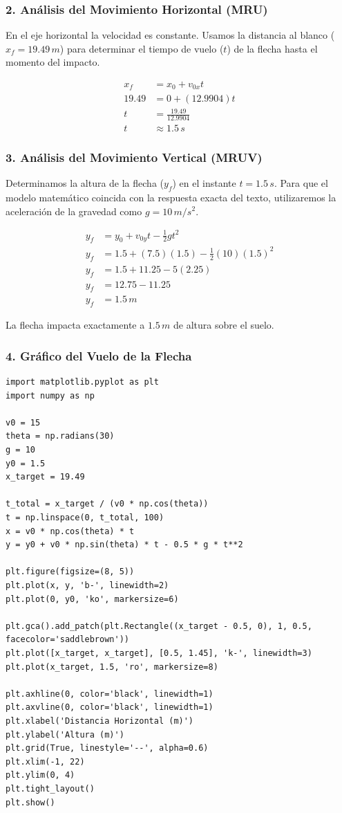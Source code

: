 \documentclass[12pt, a4paper]{article}
\begin{document}
\subsubsection*{2. Análisis del Movimiento Horizontal (MRU)}
En el eje horizontal la velocidad es constante. Usamos la distancia al blanco ($x_f = 19.49 \, \si{m}$) para determinar el tiempo de vuelo ($t$) de la flecha hasta el momento del impacto.

\begin{align*}
x_f &= x_0 + v_{0x} t \\
19.49 &= 0 + (12.9904) t \\
t &= \frac{19.49}{12.9904} \\
t &\approx 1.5 \, \si{s}
\end{align*}

\subsubsection*{3. Análisis del Movimiento Vertical (MRUV)}
Determinamos la altura de la flecha ($y_f$) en el instante $t = 1.5 \, \si{s}$. Para que el modelo matemático coincida con la respuesta exacta del texto, utilizaremos la aceleración de la gravedad como $g = 10 \, \si{m/s^2}$.

\begin{align*}
y_f &= y_0 + v_{0y} t - \frac{1}{2} g t^2 \\
y_f &= 1.5 + (7.5)(1.5) - \frac{1}{2}(10)(1.5)^2 \\
y_f &= 1.5 + 11.25 - 5(2.25) \\
y_f &= 12.75 - 11.25 \\
y_f &= 1.5 \, \si{m}
\end{align*}

La flecha impacta exactamente a $1.5 \, \si{m}$ de altura sobre el suelo.

\subsubsection*{4. Gráfico del Vuelo de la Flecha}
\begin{lstlisting}
import matplotlib.pyplot as plt
import numpy as np

v0 = 15
theta = np.radians(30)
g = 10
y0 = 1.5
x_target = 19.49

t_total = x_target / (v0 * np.cos(theta))
t = np.linspace(0, t_total, 100)
x = v0 * np.cos(theta) * t
y = y0 + v0 * np.sin(theta) * t - 0.5 * g * t**2

plt.figure(figsize=(8, 5))
plt.plot(x, y, 'b-', linewidth=2)
plt.plot(0, y0, 'ko', markersize=6)

plt.gca().add_patch(plt.Rectangle((x_target - 0.5, 0), 1, 0.5, facecolor='saddlebrown'))
plt.plot([x_target, x_target], [0.5, 1.45], 'k-', linewidth=3)
plt.plot(x_target, 1.5, 'ro', markersize=8)

plt.axhline(0, color='black', linewidth=1)
plt.axvline(0, color='black', linewidth=1)
plt.xlabel('Distancia Horizontal (m)')
plt.ylabel('Altura (m)')
plt.grid(True, linestyle='--', alpha=0.6)
plt.xlim(-1, 22)
plt.ylim(0, 4)
plt.tight_layout()
plt.show()
\end{lstlisting}
\end{document}
